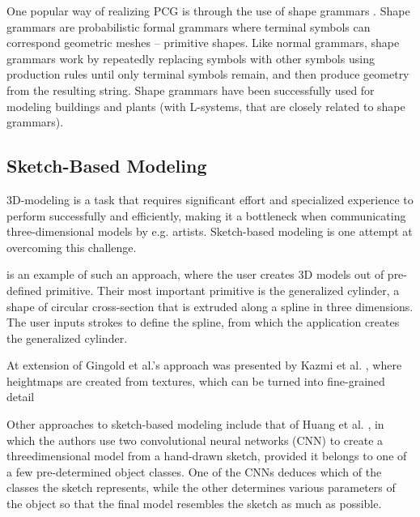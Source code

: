 \documentclass[english]{article}
\begin{document}
One popular way of realizing PCG is through the use of shape grammars \cite{stiny2006shape}. Shape grammars are probabilistic formal grammars where terminal symbols can correspond geometric meshes -- primitive shapes. Like normal grammars, shape grammars work by repeatedly replacing symbols with other symbols using production rules until only terminal symbols remain, and then produce geometry from the resulting string. Shape grammars have been successfully used for modeling buildings \cite{building_shape_grammar} and plants \cite{plant_l_system} (with L-systems, that are closely related to shape grammars).



\subsection{Sketch-Based Modeling} \label{subsection_review_sketch}

3D-modeling is a task that requires significant effort and specialized experience to perform successfully and efficiently, making it a bottleneck when communicating three-dimensional models by e.g. artists. Sketch-based modeling is one attempt at overcoming this challenge. 

\cite{gingold09} is an example of such an approach, where the user creates 3D models out of pre-defined primitive. Their most important primitive is the generalized cylinder, a shape of circular cross-section that is extruded along a spline in three dimensions. The user inputs strokes to define the spline, from which the application creates the generalized cylinder.

At extension of Gingold et al.'s approach was presented by Kazmi et al. \cite{hybrid_character_modeling}, where heightmaps are created from textures, which can be turned into fine-grained detail 

Other approaches to sketch-based modeling include that of Huang et al. \cite{procedural_sketch_cnn}, in which the authors use two convolutional neural networks (CNN) to create a threedimensional model from a hand-drawn sketch, provided it belongs to one of a few pre-determined object classes. One of the CNNs deduces which of the classes the sketch represents, while the other determines various parameters of the object so that the final model resembles the sketch as much as possible.
\end{document}
